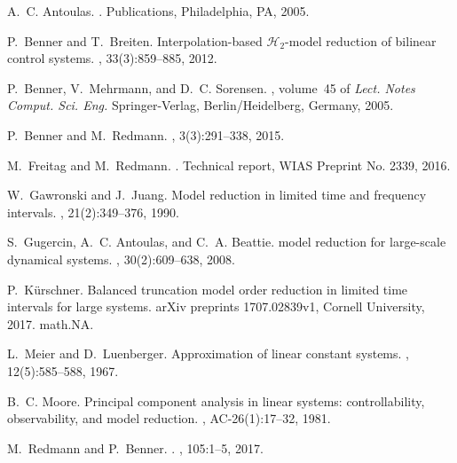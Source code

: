 \documentclass[a4paper,11pt, twoside]{article}
\begin{document}

\begin{thebibliography}{10}

A.~C. Antoulas.
.
 Publications, Philadelphia, PA, 2005.

P.~Benner and T.~Breiten.
\newblock Interpolation-based $\mathcal{H}_2$-model reduction of bilinear
  control systems.
, 33(3):859--885, 2012.

P.~Benner, V.~Mehrmann, and D.~C. Sorensen.
, volume~45 of {\em
  Lect. Notes Comput. Sci. Eng.}
\newblock Springer-Verlag, Berlin/Heidelberg, Germany, 2005.

P.~{Benner} and M.~{Redmann}.
, 3(3):291--338, 2015.

M.~Freitag and M.~Redmann.
.
\newblock Technical report, WIAS Preprint No. 2339, 2016.

W.~Gawronski and J.~Juang.
\newblock Model reduction in limited time and frequency intervals.
, 21(2):349--376, 1990.

S.~Gugercin, A.~C. Antoulas, and C.~A. Beattie.
 model reduction for large-scale dynamical systems.
, 30(2):609--638, 2008.

P.~K\"urschner.
\newblock Balanced truncation model order reduction in limited time intervals
  for large systems.
\newblock arXiv preprints 1707.02839v1, Cornell University, 2017.
\newblock math.NA.

L.~Meier and D.~Luenberger.
\newblock Approximation of linear constant systems.
, 12(5):585--588, 1967.

B.~C. Moore.
\newblock Principal component analysis in linear systems: controllability,
  observability, and model reduction.
, AC-26(1):17--32, 1981.

M.~Redmann and P.~Benner.
.
, 105:1--5, 2017.


\end{thebibliography}
\end{document}
